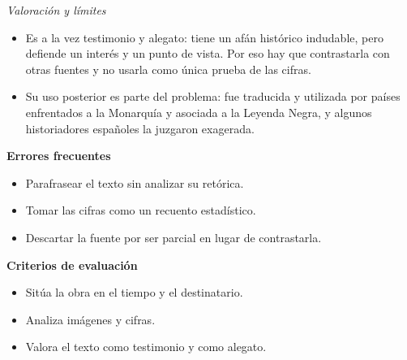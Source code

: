 \documentclass{book}
\begin{document}
\begin{tcolorbox}[title={Ejercicio resuelto}, studiumworked, breakable]
\noindent\textit{Valoración y límites}
\begin{itemize}
\item Es a la vez testimonio y alegato: tiene un afán histórico indudable, pero defiende un interés y un punto de vista. Por eso hay que contrastarla con otras fuentes y no usarla como única prueba de las cifras.
\item Su uso posterior es parte del problema: fue traducida y utilizada por países enfrentados a la Monarquía y asociada a la Leyenda Negra, y algunos historiadores españoles la juzgaron exagerada.
\end{itemize}

\noindent\textbf{Errores frecuentes}
\begin{itemize}
\item Parafrasear el texto sin analizar su retórica.
\item Tomar las cifras como un recuento estadístico.
\item Descartar la fuente por ser parcial en lugar de contrastarla.
\end{itemize}

\noindent\textbf{Criterios de evaluación}
\begin{itemize}
\item Sitúa la obra en el tiempo y el destinatario.
\item Analiza imágenes y cifras.
\item Valora el texto como testimonio y como alegato.
\end{itemize}
\end{tcolorbox}
\end{document}
